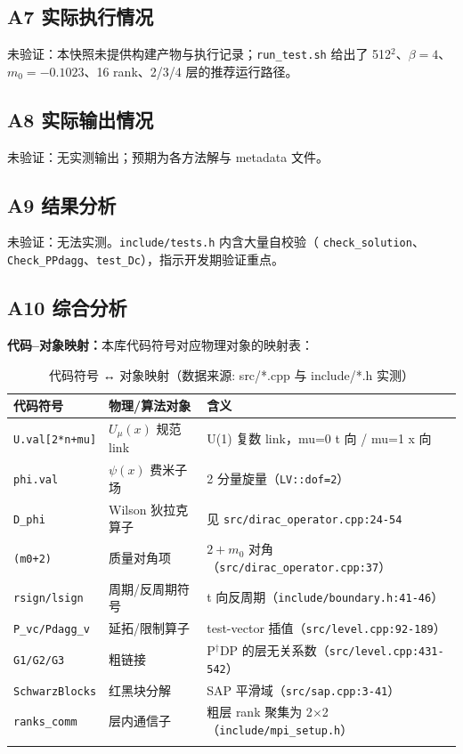 \documentclass[UTF8]{ctexart}
\begin{document}
\subsection{A7 实际执行情况}
\textcolor{warn}{未验证}：本快照未提供构建产物与执行记录；\texttt{run\_test.sh} 给出了
512$^2$、$\beta=4$、$m_0=-0.1023$、16 rank、2/3/4 层的推荐运行路径。

\subsection{A8 实际输出情况}
\textcolor{warn}{未验证}：无实测输出；预期为各方法解与 metadata 文件。

\subsection{A9 结果分析}
\textcolor{warn}{未验证}：无法实测。\texttt{\nolinkurl{include/tests.h}} 内含大量自校验（
\texttt{check\_solution}、\texttt{Check\_PPdagg}、\texttt{test\_Dc}），指示开发期验证重点。

\subsection{A10 综合分析}
\textbf{代码--对象映射：}本库代码符号对应物理对象的映射表：
\begin{xltabular}{\textwidth}{lXX}
\toprule
\textcolor{struct}{代码符号} & 物理/算法对象 & 含义 \\
\midrule
\endhead
\texttt{U.val[2*n+mu]} & $U_\mu(x)$ 规范 link & U(1) 复数 link，mu=0 t 向 / mu=1 x 向 \\
\texttt{phi.val} & $\psi(x)$ 费米子场 & 2 分量旋量（\texttt{LV::dof=2}）\\
\texttt{D\_phi} & Wilson 狄拉克算子 & 见 \texttt{\nolinkurl{src/dirac_operator.cpp:24-54}} \\
\texttt{(m0+2)} & 质量对角项 & $2+m_0$ 对角（\texttt{src/dirac\_operator.cpp:37}）\\
\texttt{rsign/lsign} & 周期/反周期符号 & t 向反周期（\texttt{\nolinkurl{include/boundary.h:41-46}}）\\
\texttt{P\_vc/Pdagg\_v} & 延拓/限制算子 & test-vector 插值（\texttt{\nolinkurl{src/level.cpp:92-189}}）\\
\texttt{G1/G2/G3} & 粗链接 & P$^\dagger$DP 的层无关系数（\texttt{\nolinkurl{src/level.cpp:431-542}}）\\
\texttt{SchwarzBlocks} & 红黑块分解 & SAP 平滑域（\texttt{\nolinkurl{src/sap.cpp:3-41}}）\\
\texttt{ranks\_comm} & 层内通信子 & 粗层 rank 聚集为 2$\times$2（\texttt{\nolinkurl{include/mpi_setup.h}}）\\
\bottomrule
\caption{代码符号 ↔ 对象映射（数据来源: src/*.cpp 与 include/*.h 实测）}
\end{xltabular}
\end{document}
